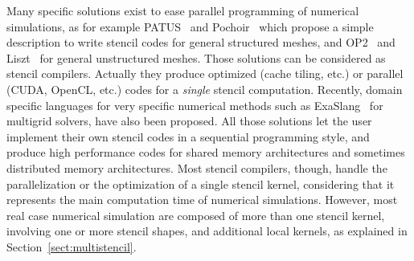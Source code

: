 
Many specific solutions exist to ease parallel programming of numerical simulations, %
as for example %
PATUS~\cite{citeulike12258902} and Pochoir~\cite{spaaTangCKLL11} which propose a simple description to write stencil codes for general structured meshes, and OP2~\cite{Giles2011} and Liszt~\cite{DeVito2011LDS} for general unstructured meshes. Those solutions can be considered as stencil compilers. Actually they produce optimized (cache tiling, etc.) or parallel (CUDA, OpenCL, etc.) codes for a \emph{single} stencil computation.
Recently, domain specific languages for very specific numerical methods such as ExaSlang~\cite{Schmitt:2014:EDL:2691166.2691171} for multigrid solvers, have also been proposed.%
All those solutions let the user implement their own stencil codes in a sequential programming style, and produce high performance codes for shared memory architectures and sometimes distributed memory architectures. 
Most stencil compilers, though, handle the parallelization or the optimization of a single stencil kernel, considering that it represents the main computation time of numerical simulations. However, most real case numerical simulation are composed of more than one stencil kernel, involving one or more stencil shapes, and additional local kernels, as explained in Section~\ref{sect:multistencil}.

